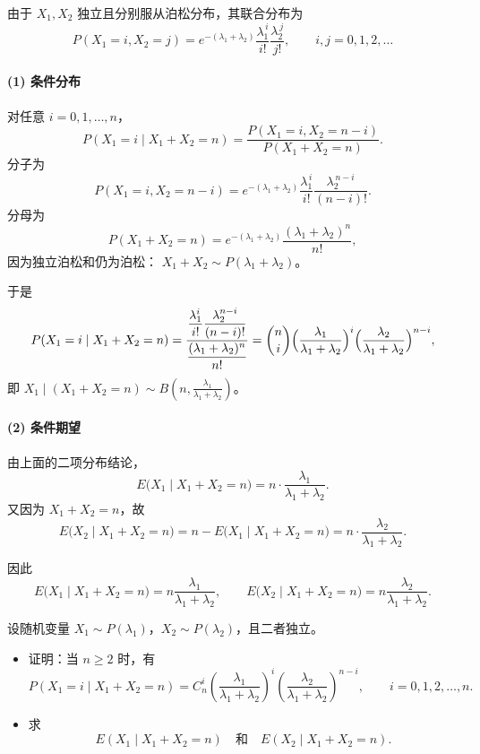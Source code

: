 \begin{solution}
由于 $X_1,X_2$ 独立且分别服从泊松分布，其联合分布为
\[
P(X_1=i,X_2=j)
= e^{-(\lambda_1+\lambda_2)}
  \frac{\lambda_1^{\,i}}{i!}\frac{\lambda_2^{\,j}}{j!},
\qquad i,j=0,1,2,\dots
\]

\paragraph{(1) 条件分布} 对任意 $i=0,1,\dots,n$，
\[
P(X_1=i\mid X_1+X_2=n)
= \frac{P(X_1=i,X_2=n-i)}{P(X_1+X_2=n)}.
\]
分子为
\[
P(X_1=i,X_2=n-i)
= e^{-(\lambda_1+\lambda_2)}
  \frac{\lambda_1^{\,i}}{i!}\frac{\lambda_2^{\,n-i}}{(n-i)!}.
\]
分母为
\[
P(X_1+X_2=n)
= e^{-(\lambda_1+\lambda_2)}
  \frac{(\lambda_1+\lambda_2)^n}{n!},
\]
因为独立泊松和仍为泊松： $X_1+X_2\sim P(\lambda_1+\lambda_2)$。

于是
\[
P(X_1=i\mid X_1+X_2=n)
= \frac{ \dfrac{\lambda_1^i}{i!}\dfrac{\lambda_2^{n-i}}{(n-i)!} }
       { \dfrac{(\lambda_1+\lambda_2)^n}{n!} }
= \binom{n}{i}
  \Bigl(\frac{\lambda_1}{\lambda_1+\lambda_2}\Bigr)^i
  \Bigl(\frac{\lambda_2}{\lambda_1+\lambda_2}\Bigr)^{n-i},
\]
即 $X_1\mid(X_1+X_2=n)\sim B\!\left(n,\frac{\lambda_1}{\lambda_1+\lambda_2}\right)$。

\paragraph{(2) 条件期望} 由上面的二项分布结论，
\[
E\bigl(X_1\mid X_1+X_2=n\bigr)
= n\cdot \frac{\lambda_1}{\lambda_1+\lambda_2}.
\]
又因为 $X_1+X_2=n$，故
\[
E\bigl(X_2\mid X_1+X_2=n\bigr)
= n - E\bigl(X_1\mid X_1+X_2=n\bigr)
= n\cdot \frac{\lambda_2}{\lambda_1+\lambda_2}.
\]

因此
\[
E\bigl(X_1\mid X_1+X_2=n\bigr)
= n\frac{\lambda_1}{\lambda_1+\lambda_2},\qquad
E\bigl(X_2\mid X_1+X_2=n\bigr)
= n\frac{\lambda_2}{\lambda_1+\lambda_2}.
\]
\end{solution}
\begin{homework}[ 3.38]
设随机变量 $X_1 \sim P(\lambda_1)$，$X_2 \sim P(\lambda_2)$，且二者独立。

\begin{itemize}
    \item[(1)] 证明：当 $n \ge 2$ 时，有
    \[
        P(X_1 = i \mid X_1 + X_2 = n) = C_n^i
        \left( \frac{\lambda_1}{\lambda_1 + \lambda_2} \right)^i
        \left( \frac{\lambda_2}{\lambda_1 + \lambda_2} \right)^{n-i},
        \qquad i = 0, 1, 2, \ldots, n.
    \]

    \item[(2)] 求
    \[
        E(X_1 \mid X_1 + X_2 = n) \quad \text{和} \quad
        E(X_2 \mid X_1 + X_2 = n).
    \]
\end{itemize}
\end{homework}

